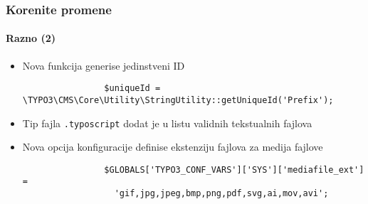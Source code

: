 \begin{frame}[fragile]
	\frametitle{Korenite promene}
	\framesubtitle{Razno (2)}


	\begin{itemize}

		\item Nova funkcija generise jedinstveni ID

			\begin{lstlisting}
				$uniqueId = \TYPO3\CMS\Core\Utility\StringUtility::getUniqueId('Prefix');
			\end{lstlisting}

		\item Tip fajla \texttt{.typoscript}  dodat je u listu validnih tekstualnih fajlova

		\item Nova opcija konfiguracije definise ekstenziju fajlova za medija fajlove

			\begin{lstlisting}
				$GLOBALS['TYPO3_CONF_VARS']['SYS']['mediafile_ext'] =
				  'gif,jpg,jpeg,bmp,png,pdf,svg,ai,mov,avi';
			\end{lstlisting}

	\end{itemize}

	\breakingchange

\end{frame}

